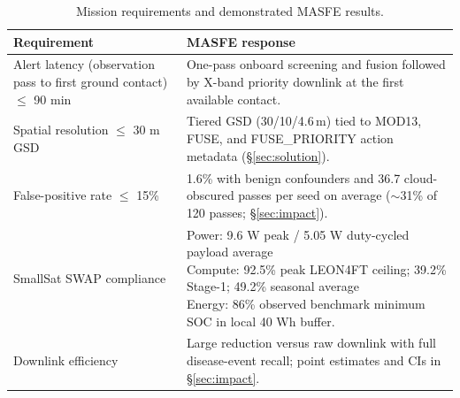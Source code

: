 \documentclass[11pt,letterpaper]{article}
\begin{document}
\begin{table}[!htbp]
\centering
\caption{Mission requirements and demonstrated MASFE results.}
\label{tab:req-results}
\begin{tabularx}{\linewidth}{p{4cm}X}
\toprule
\textbf{Requirement} & \textbf{MASFE response} \\
\midrule
Alert latency (observation pass to first ground contact) $\leq$ 90 min & One-pass onboard screening and fusion followed by X-band priority downlink at the first available contact. \\
Spatial resolution $\leq$ 30 m GSD & Tiered GSD (30/10/4.6\,m) tied to MOD13, FUSE, and FUSE\_PRIORITY action metadata (\S\ref{sec:solution}). \\
False-positive rate $\leq$ 15\% & 1.6\% with benign confounders and 36.7 cloud-obscured passes per seed on average ($\sim$31\% of 120 passes; \S\ref{sec:impact}). \\
SmallSat SWAP compliance & \shortstack[l]{Power: 9.6 W peak / 5.05 W duty-cycled payload average\\Compute: 92.5\% peak LEON4FT ceiling; 39.2\% Stage-1; 49.2\% seasonal average\\Energy: 86\% observed benchmark minimum SOC in local 40 Wh buffer.} \\
Downlink efficiency & Large reduction versus raw downlink with full disease-event recall; point estimates and CIs in \S\ref{sec:impact}. \\
\bottomrule
\end{tabularx}
\end{table}
\end{document}
